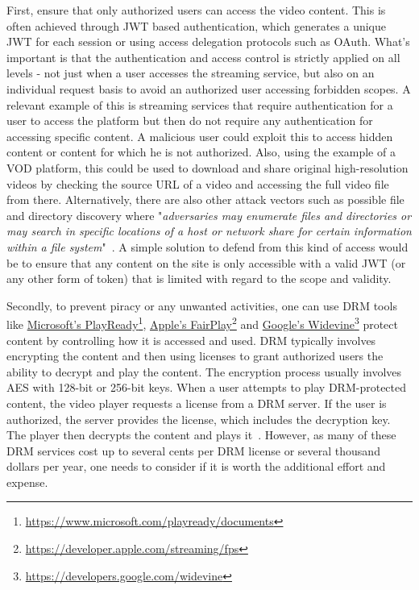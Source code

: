 First, ensure that only authorized users can access the video content. This is often achieved through \ac{JWT} based authentication, which generates a unique \ac{JWT} for each session or using access delegation protocols such as OAuth. What's important is that the authentication and access control is strictly applied on all levels - not just when a user accesses the streaming service, but also on an individual request basis to avoid an authorized user accessing forbidden scopes. A relevant example of this is streaming services that require authentication for a user to access the platform but then do not require any authentication for accessing specific content. A malicious user could exploit this to access hidden content or content for which he is not authorized. Also, using the example of a \ac{VOD} platform, this could be used to download and share original high-resolution videos by checking the source URL of a video and accessing the full video file from there.
Alternatively, there are also other attack vectors such as possible file and directory discovery where "\textit{adversaries may enumerate files and directories or may search in specific locations of a host or network share for certain information within a file system}"~\parencite{mitre}. A simple solution to defend from this kind of access would be to ensure that any content on the site is only accessible with a valid \ac{JWT} (or any other form of token) that is limited with regard to the scope and validity.

Secondly, to prevent piracy or any unwanted activities, one can use \ac{DRM} tools like \href{https://www.microsoft.com/playready/documents}{Microsoft's PlayReady}\footnote{\url{https://www.microsoft.com/playready/documents}}, \href{https://developer.apple.com/streaming/fps}{Apple's FairPlay}\footnote{\url{https://developer.apple.com/streaming/fps}} and \href{https://developers.google.com/widevine}{Google's Widevine}\footnote{\url{https://developers.google.com/widevine}} protect content by controlling how it is accessed and used. \ac{DRM} typically involves encrypting the content and then using licenses to grant authorized users the ability to decrypt and play the content. The encryption process usually involves \ac{AES} with 128-bit or 256-bit keys. When a user attempts to play \ac{DRM}-protected content, the video player requests a license from a \ac{DRM} server. If the user is authorized, the server provides the license, which includes the decryption key. The player then decrypts the content and plays it~\parencite{drm}. However, as many of these \ac{DRM} services cost up to several cents per \ac{DRM} license or several thousand dollars per year, one needs to consider if it is worth the additional effort and expense.

